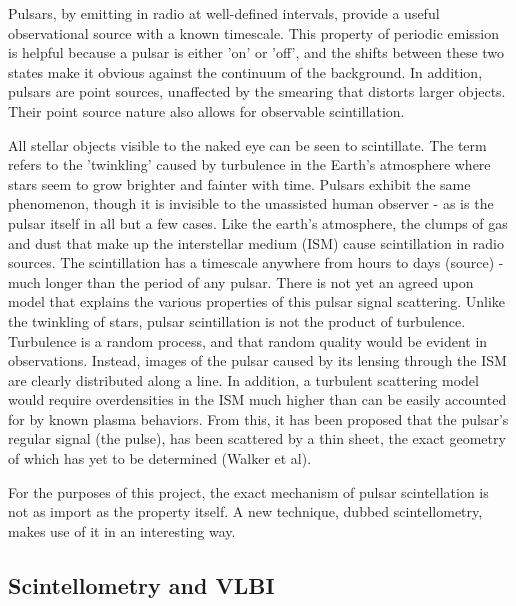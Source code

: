 \documentclass[a4paper,12pt]{article}
\begin{document}
Pulsars, by emitting in radio at well-defined intervals, provide a useful observational source with a known timescale. This property of periodic emission is helpful because a pulsar is either 'on' or 'off', and the shifts between these two states make it obvious against the continuum of the background. In addition, pulsars are point sources, unaffected by the smearing that distorts larger objects. Their point source nature also allows for observable scintillation. 

All stellar objects visible to the naked eye can be seen to scintillate. The term refers to the 'twinkling' caused by turbulence in the Earth's atmosphere where stars seem to grow brighter and fainter with time. Pulsars exhibit the same phenomenon, though it is invisible to the unassisted human observer - as is the pulsar itself in all but a few cases. Like the earth's atmosphere, the clumps of gas and dust that make up the interstellar medium (ISM) cause scintillation in radio sources. The scintillation has a timescale anywhere from hours to days (source) - much longer than the period of any pulsar. There is not yet an agreed upon model that explains the various properties of this pulsar signal scattering. Unlike the twinkling of stars, pulsar scintillation is not the product of turbulence. Turbulence is a random process, and that random quality would be evident in observations. Instead, images of the pulsar caused by its lensing through the ISM are clearly distributed along a line. In addition, a turbulent scattering model would require overdensities in the ISM much higher than can be easily accounted for by known plasma behaviors. From this, it has been proposed that the pulsar's regular signal (the pulse), has been scattered by a thin sheet, the exact geometry of which has yet to be determined (Walker et al).

For the purposes of this project, the exact mechanism of pulsar scintellation is not as import as the property itself. A new technique, dubbed scintellometry, makes use of it in an interesting way.


\subsection{Scintellometry and VLBI}
\label{sec:scintellometry}
\end{document}
